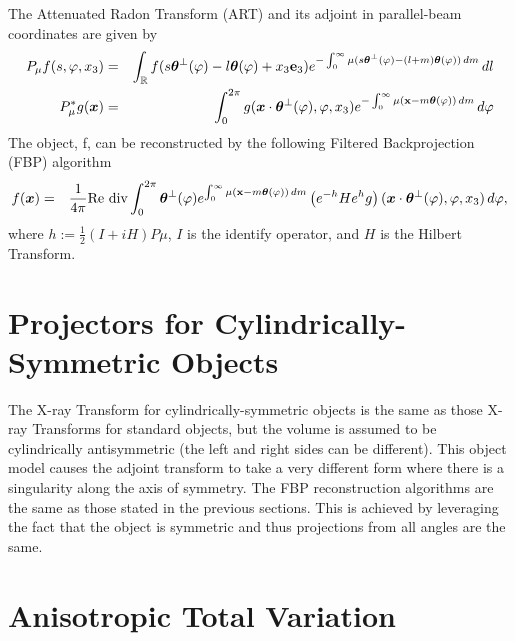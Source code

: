 \documentclass[11pt]{article}
\begin{document}
The Attenuated Radon Transform (ART) and its adjoint in parallel-beam coordinates are given by
\begin{eqnarray*}
P_{\mu}f(s, \varphi, x_3) &=& \int_\mathbb{R} f(s\bm{\theta}^\perp(\varphi) - l\bm{\theta}(\varphi) + x_3\textbf{e}_3) e^{-\int_0^\infty \mu(s\bm{\theta}^\perp(\varphi) - (l+m)\bm{\theta}(\varphi)) \, dm} \, dl \\
P_{\mu}^*g(\bm{x}) &=& \int_0^{2\pi} g(\bm{x}\cdot\bm{\theta}^\perp(\varphi), \varphi, x_3) e^{-\int_0^\infty \mu(\textbf{x}-m\bm{\theta}(\varphi)) \, dm} \, d\varphi
\end{eqnarray*}
The object, f, can be reconstructed by the following Filtered Backprojection (FBP) algorithm
\begin{eqnarray*}
f(\bm{x}) &=& \frac{1}{4\pi} \text{Re div} \int_0^{2\pi} \bm{\theta}^\perp(\varphi) e^{\int_0^\infty \mu(\textbf{x}-m\bm{\theta}(\varphi)) \, dm} \left( e^{-h} H e^{h}g \right)(\bm{x}\cdot\bm{\theta}^\perp(\varphi), \varphi, x_3) \, d\varphi,
\end{eqnarray*}
where $h := \frac{1}{2}\left(I + iH\right) P\mu$, $I$ is the identify operator, and $H$ is the Hilbert Transform.

\section{Projectors for Cylindrically-Symmetric Objects}

The X-ray Transform for cylindrically-symmetric objects is the same as those X-ray Transforms for standard objects, but the volume is assumed to be cylindrically antisymmetric (the left and right sides can be different).  This object model causes the adjoint transform to take a very different form where there is a singularity along the axis of symmetry.  The FBP reconstruction algorithms are the same as those stated in the previous sections.  This is achieved by leveraging the fact that the object is symmetric and thus projections from all angles are the same.

\section{Anisotropic Total Variation}
\end{document}
